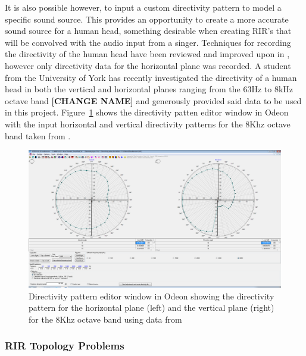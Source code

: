 \documentclass[../../main.tex]{subfiles}
\begin{document}
				It is also possible however, to input a custom directivity pattern to model a specific sound source. This provides an opportunity to create a more accurate sound source for a human head, something desirable when creating \ac{RIR}'s that will be convolved with the audio input from a singer. Techniques for recording the directivity of the human head have been reviewed and improved upon in \cite{Monson2012b}, however only directivity data for the horizontal plane was recorded. A student from the University of York has recently investigated the directivity of a human head in both the vertical and horizontal planes ranging from the 63Hz to 8kHz octave band \cite{calum} \textbf{[CHANGE NAME]} and generously provided said data to be used in this project. Figure~\ref{directivity} shows the directivity patten editor window in Odeon with the input horizontal and vertical directivity patterns for the 8Khz octave band taken from \cite{calum}. 


				\begin{figure}[H]
					\centerline{\includegraphics[scale = 0.3]{Sections/Implementation/Odeon/images/Directivity/DirectivityPattern.png}}
					\caption{Directivity pattern editor window in Odeon showing the directivity pattern for the horizontal plane (left) and the vertical plane (right) for the 8Khz octave band using data from \cite{calum}}
					\label{directivity}
				\end{figure}


		\subsubsection{RIR Topology Problems}
		\label{odeonError}
\end{document}
